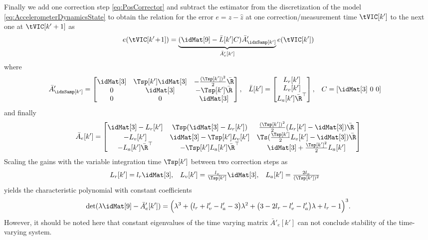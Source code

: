 Finally we add one correction step \eqref{eq:PosCorrector} and subtract the estimator from the discretization of the model \eqref{eq:AccelerometerDynamicsState} to obtain the relation for the error $e = z - \hat{z}$ at one correction/measurement time $\tVIC[k']$ to the next one at $\tVIC[k'+1]$ as
\begin{align}
 e(\tVIC[k'\!+\!1]) = \underbrace{(\idMat[9] - \bar{L}[k'] C) \bar{A}'_\idxSamp[k']}_{\bar{A}'_e[k']} e(\tVIC[k'])
\end{align}
where
\begin{align}
 \bar{A}'_\idxSamp[k'] &=
 \begin{bmatrix}
  \idMat[3] & \Tsp[k'] \idMat[3] & -\tfrac{(\Tsp[k'])^2}{2} \bar{\R} \\
  0 & \idMat[3] & -\Tsp[k']\bar{\R} \\
  0 & 0 & \idMat[3]
 \end{bmatrix},&
 \bar{L}[k'] &= \begin{bmatrix} L_r[k'] \\ L_v[k'] \\ L_a[k'] \bar{\R}^\top \end{bmatrix},&
 C &= [\idMat[3] \ 0 \ 0]
\end{align}
and finally
\begin{align}
 \bar{A}_e[k'] = 
 \begin{bmatrix} 
  \idMat[3] - L_r[k'] & \Tsp(\idMat[3] - L_r[k']) & \tfrac{(\Tsp[k'])^2}{2}(L_r[k'] - \idMat[3]) \bar{\R} \\
  -L_v[k'] & \idMat[3] - \Tsp[k'] L_v[k'] & \Ts(\tfrac{\Tsp[k']}{2} L_v[k'] - \idMat[3])\bar{\R} \\
  -L_a[k'] \bar{\R}^\top & -\Tsp[k'] L_a[k'] \bar{\R}^\top & \idMat[3] + \tfrac{\Tsp[k']^2}{2} L_a[k']
 \end{bmatrix}
\end{align}
Scaling the gains with the variable integration time $\Tsp[k']$ between two correction steps as
\begin{align}
 L_r[k'] &= l_r \idMat[3],& 
 L_v[k'] &= \tfrac{l_v}{\Tsp[k']} \idMat[3],&
 L_a[k'] &= \tfrac{2 l_a}{(\Tsp[k'])^2}
\end{align}
yields the characteristic polynomial with constant coefficients
\begin{align}
 \det(\lambda \idMat[9] - \bar{A}'_e[k'])
 = \Big( \lambda^3
  + \big(l_r + l'_v - l'_a - 3 \big) \lambda^2
  + \big(3 - 2 l_r - l'_v - l'_a \big) \lambda
  + l_r - 1
 \Big)^3.
\end{align}
However, it should be noted here that constant eigenvalues of the time varying matrix $\bar{A}'_e[k']$ can not conclude stability of the time-varying system.

